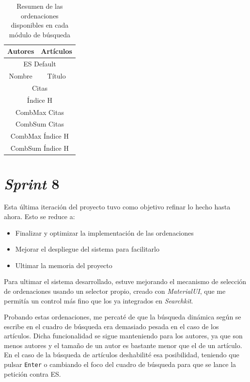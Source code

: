 \begin{table} [h!]
	\centering
	\begin{tabular}{| c | c |}
		\hline
		\textbf{Autores} & \textbf{Artículos}\\
		\hline\hline
		\multicolumn{2}{|c|}{\acrshort{ES} Default} \\ \hline
		Nombre & Título \\ \hline
		\multicolumn{2}{|c|}{Citas} \\ \hline 
		\multicolumn{2}{|c|}{Índice H} \\ \hline
		\multicolumn{2}{|c|}{CombMax Citas} \\ \hline
		\multicolumn{2}{|c|}{CombSum Citas} \\ \hline
		\multicolumn{2}{|c|}{CombMax Índice H} \\ \hline
		\multicolumn{2}{|c|}{CombSum Índice H } \\ \hline
		
	\end{tabular}
	\caption{Resumen de las ordenaciones disponibles en cada módulo de búsqueda}
\end{table}


\section{\textit{Sprint} 8}
Esta última iteración del proyecto tuvo como objetivo refinar lo hecho hasta ahora. Esto se reduce a:
\begin{itemize}
	\item Finalizar y optimizar la implementación de las ordenaciones 
	\item Mejorar el despliegue del sistema para facilitarlo
	\item Ultimar la memoria del proyecto
\end{itemize}

Para ultimar el sistema desarrollado, estuve mejorando el mecanismo de selección de ordenaciones usando un selector propio, creado con \textit{MaterialUI}, que me permitía un control más fino que los ya integrados en \textit{Searchkit}. 

Probando estas ordenaciones, me percaté de que la búsqueda dinámica según se escribe en el cuadro de búsqueda era demasiado pesada en el caso de los artículos. Dicha funcionalidad se sigue manteniendo para los autores, ya que son menos autores y el tamaño de un autor es bastante menor que el de un artículo. En el caso de la búsqueda de artículos deshabilité esa posibilidad, teniendo que pulsar \texttt{Enter} o cambiando el foco del cuadro de búsqueda para que se lance la petición contra \acrshort{ES}.

